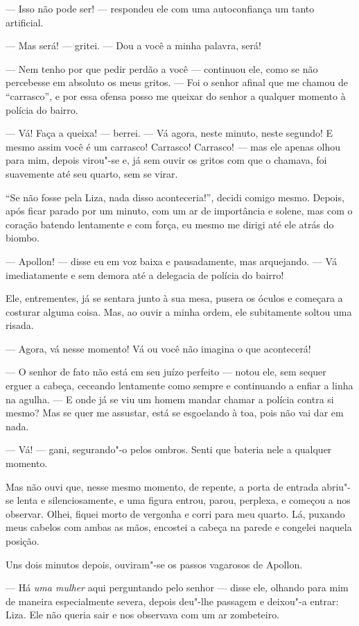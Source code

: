 --- Isso não pode ser! --- respondeu ele com uma autoconfiança um tanto
artificial.

--- Mas será! --- gritei. --- Dou a você a minha palavra, será!

--- Nem tenho por que pedir perdão a você --- continuou ele, como se não
percebesse em absoluto os meus gritos. --- Foi o senhor afinal que me
chamou de “carrasco”, e por essa ofensa posso me queixar do senhor a
qualquer momento à polícia do bairro.

--- Vá! Faça a queixa! --- berrei. --- Vá agora, neste minuto, neste segundo!
E mesmo assim você é um carrasco! Carrasco! Carrasco! --- mas ele apenas
olhou para mim, depois virou"-se e, já sem ouvir os gritos com que o
chamava, foi suavemente até seu quarto, sem se virar.

“Se não fosse pela Liza, nada disso aconteceria!”, decidi comigo mesmo.
Depois, após ficar parado por um minuto, com um ar de importância e
solene, mas com o coração batendo lentamente e com força, eu mesmo me
dirigi até ele atrás do biombo.

--- Apollon! --- disse eu em voz baixa e pausadamente, mas arquejando. --- Vá
imediatamente e sem demora até a delegacia de polícia do bairro!

Ele, entrementes, já se sentara junto à sua mesa, pusera os óculos e
começara a costurar alguma coisa. Mas, ao ouvir a minha ordem, ele
subitamente soltou uma risada.

--- Agora, vá nesse momento! Vá ou você não imagina o que acontecerá!

--- O senhor de fato não está em seu juízo perfeito --- notou ele, sem
sequer erguer a cabeça, ceceando lentamente como sempre e continuando a
enfiar a linha na agulha. --- E onde já se viu um homem mandar chamar a
polícia contra si mesmo? Mas se quer me assustar, está se esgoelando à
toa, pois não vai dar em nada.

--- Vá! --- gani, segurando"-o pelos ombros. Senti que bateria nele a
qualquer momento.

Mas não ouvi que, nesse mesmo momento, de repente, a porta de entrada
abriu"-se lenta e silenciosamente, e uma figura entrou, parou, perplexa,
e começou a nos observar. Olhei, fiquei morto de vergonha e corri para
meu quarto. Lá, puxando meus cabelos com ambas as mãos, encostei a
cabeça na parede e congelei naquela posição.

Uns dois minutos depois, ouviram"-se os passos vagarosos de Apollon.

--- Há \textit{uma mulher} aqui perguntando pelo
senhor --- disse ele, olhando para mim de maneira especialmente severa,
depois deu"-lhe passagem e deixou"-a entrar: Liza. Ele não queria sair e
nos observava com um ar zombeteiro.

